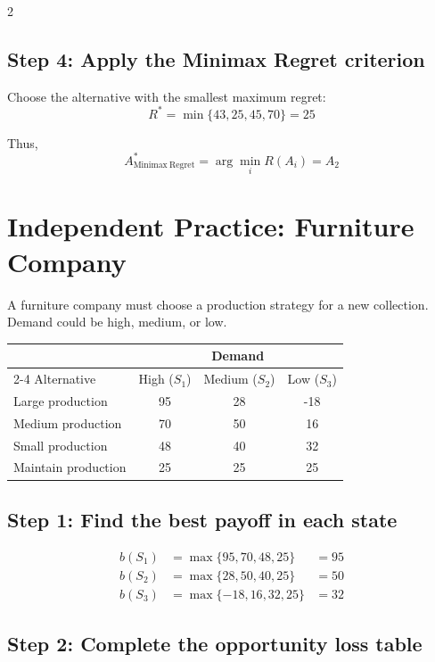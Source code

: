 \begin{multicols}{2}
		\subsection*{Step 4: Apply the Minimax Regret criterion}
		
		Choose the alternative with the smallest maximum regret:
		\[
		R^*
		=
		\min\{43,25,45,70\}
		=
		25
		\]
		
		Thus,
		\[
		A^*_{\mathrm{Minimax\ Regret}}
		=
		\arg\min_i R(A_i)
		=
		A_2
		\]
		
		\section{Independent Practice: Furniture Company}
		
		A furniture company must choose a production strategy for a new collection.
		Demand could be high, medium, or low.
		
		\begin{center}
			\renewcommand{\arraystretch}{1.3}
			\small
			\begin{tabular}{lccc}
				\toprule
				& \multicolumn{3}{c}{Demand} \\
				\cmidrule(lr){2-4}
				Alternative & High ($S_1$) & Medium ($S_2$) & Low ($S_3$) \\
				\midrule
				Large production  & 95 & 28 & -18 \\
				Medium production & 70 & 50 & 16 \\
				Small production  & 48 & 40 & 32 \\
				Maintain production & 25 & 25 & 25 \\
				\bottomrule
			\end{tabular}
		\end{center}
		
		\subsection*{Step 1: Find the best payoff in each state}
		
		\[
		\begin{array}{lll}
			b(S_1) &= \max\{95,70,48,25\} &= 95 \\[3pt]
			b(S_2) &= \max\{28,50,40,25\} &= 50 \\[3pt]
			b(S_3) &= \max\{-18,16,32,25\} &= 32
		\end{array}
		\]
		
		\subsection*{Step 2: Complete the opportunity loss table}
		

\end{multicols}
